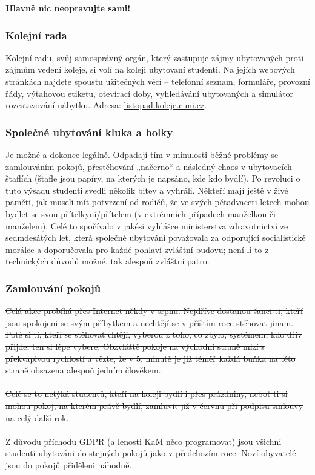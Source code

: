 \textbf{Hlavně nic neopravujte sami!}


\subsubsection{Kolejní rada}
Kolejní radu, svůj samosprávný orgán, který zastupuje zájmy ubytovaných proti
zájmům vedení koleje, si volí na koleji ubytovaní studenti. Na jejích webových
stránkách najdete spoustu užitečných věcí – telefonní seznam, formuláře,
provozní řády, výtahovou etiketu, otevírací doby, vyhledávání ubytovaných a
simulátor rozestavování nábytku. Adresa: \url{listopad.koleje.cuni.cz}.


\subsubsection{Společné ubytování kluka a holky}
Je možné a dokonce legálně. Odpadají tím v minulosti běžné problémy se
zamlouváním pokojů, přestěhování „načerno“ a následný chaos v ubytovacích
štaflích (štafle jsou papíry, na kterých je napsáno, kde kdo bydlí). Po revoluci
o tuto výsadu studenti svedli několik bitev a vyhráli. Někteří mají ještě v živé
paměti, jak museli mít potvrzení od rodičů, že ve svých pětadvaceti letech mohou
bydlet se svou přítelkyní/přítelem (v extrémních případech manželkou či
manželem). Celé to spočívalo v jakési vyhlášce ministerstva zdravotnictví ze
sedmdesátých let, která společné ubytování považovala za odporující
socialistické morálce a doporučovala pro každé pohlaví zvláštní budovu; není-li
to z technických důvodů možné, tak alespoň zvláštní patro.


\subsubsection{Zamlouvání pokojů}
\sout{Celá akce probíhá přes Internet někdy v srpnu. Nejdříve dostanou šanci ti,
kteří
jsou spokojeni se svým příbytkem a nechtějí se v příštím roce stěhovat jinam.
Poté si ti, kteří se stěhovat chtějí, vyberou z toho, co zbylo, systémem, kdo
dřív přijde, ten si lépe vybere. Obzvláště pokoje na východní straně mizí s
překvapivou rychlostí a vězte, že v 5. minutě je již téměř každá buňka na této
straně obsazena alespoň jedním člověkem.}
\\\\
\sout{Celé se to netýká studentů, kteří na koleji bydlí i přes prázdniny, neboť
ti si
mohou pokoj, na kterém právě bydlí, zamluvit již v červnu při podpisu smlouvy na
celý další rok.}
\\\\
Z důvodu příchodu GDPR (a lenosti KaM něco programovat) jsou všichni studenti
ubytováni do stejných pokojů jako v předchozím roce. Noví obyvatelé jsou do
pokojů přiděleni náhodně.



